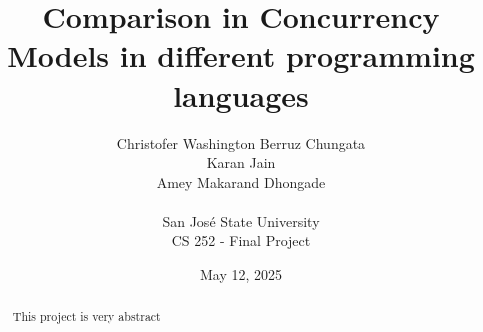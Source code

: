 \documentclass[12pt]{article}
\begin{document}
\title{Comparison in Concurrency Models in different programming languages}
\author{
    Christofer Washington Berruz Chungata \\ 
    Karan Jain \\ 
    Amey Makarand Dhongade \\ 
    \\
    San Jos\'{e} State University \\ 
    CS 252 - Final Project
}
\date{May 12, 2025}

\maketitle

\begin{abstract}
This project is very abstract
\end{abstract}










\end{document}
